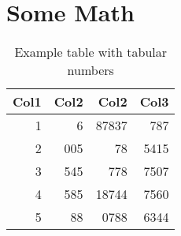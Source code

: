 \documentclass[11pt, a4paper, oneside]{article}
\title{\docsubject}
\author{\docauthor}
\date{\today}
\begin{document}
\maketitle

\blinddocument
\clearpage

\section{Some Math}
\blindmathpaper
\begin{table}[t]
    \centering
    \renewcommand{\arraystretch}{1.2}
    \setlength{\tabcolsep}{16pt}
    \caption[Example table]{Example table with tabular numbers}
    \begin{tabular}{rrrr}
        \toprule
        \textbf{Col1} & \textbf{Col2} & \textbf{Col2} & \textbf{Col3} \\
        \midrule
        1             & 6             & 87837         & 787           \\
        2             & 005           & 78            & 5415          \\
        3             & 545           & 778           & 7507          \\
        4             & 585           & 18744         & 7560          \\
        5             & 88            & 0788          & 6344          \\
        \bottomrule
    \end{tabular}
    \label{table:example}
\end{table}
\end{document}
